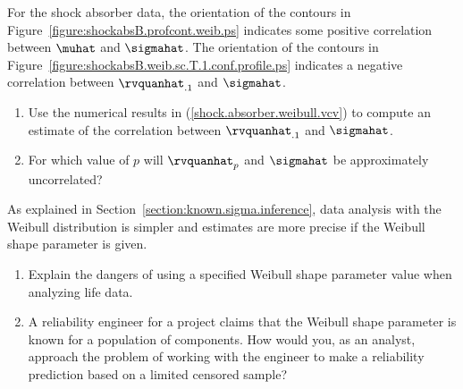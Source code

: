 \begin{exercise1}
\label{exercise:mu.sig.corr}
For the shock absorber data, the
orientation of the contours in
Figure~\ref{figure:shockabsB.profcont.weib.ps} indicates some positive
correlation between $\muhat$ and $\sigmahat$.  The orientation of the
contours in Figure~\ref{figure:shockabsB.weib.sc.T.1.conf.profile.ps}
indicates a negative correlation between $\rvquanhat_{.1}$ and
$\sigmahat$.
\begin{enumerate}
\item
Use the numerical results in (\ref{shock.absorber.weibull.vcv}) to
compute an estimate of the correlation between $\rvquanhat_{.1}$ and
$\sigmahat$.
\item 
For
which value of $p$ will $\rvquanhat_{p}$ and $\sigmahat$ be
approximately uncorrelated? 
\end{enumerate}
\end{exercise1}

\begin{exercise}
As explained in Section~\ref{section:known.sigma.inference}, data
analysis with the Weibull distribution is simpler and estimates are
more precise if the Weibull shape
parameter is given.
\begin{enumerate}
\item
Explain the dangers of using a specified Weibull shape parameter
value when analyzing life data.
\item
A reliability engineer for a project claims that the
Weibull shape parameter is known for a population of components.
How would you, as an analyst,
approach the problem of working with the engineer
to make a reliability prediction based on a limited censored sample?
\end{enumerate}
\end{exercise}

